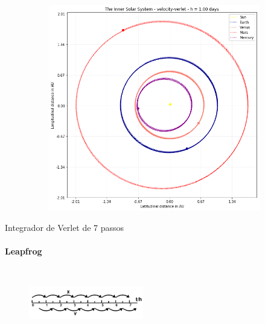 \documentclass{beamer}
\begin{document}
    \begin{frame}
      \begin{figure}[h]
        \vspace{-0.5cm}
        \includegraphics[width=110mm, height = 90mm]{resources/verlet.png}
      \end{figure}
    \end{frame}

    \begin{frame}{Integrador de Verlet de 7 passos}
      \framesubtitle{Leapfrog}%
      \begin{figure}[h]
        \vspace{-0.5cm}
        \includegraphics[width=50mm, height = 30mm]{resources/leap_scheme.png}
      \end{figure}
    \end{frame}
\end{document}
